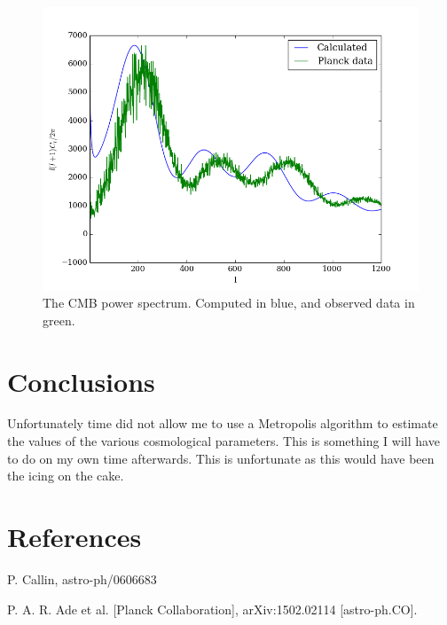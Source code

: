 \documentclass[a4paper]{report}
\begin{document}
\begin{figure}[ht]
 \includegraphics[width=\textwidth]{Cl.png}
 \caption{The CMB power spectrum. Computed in blue, and observed data in green.}
 \label{fig:Cl}
\end{figure}


\section{Conclusions}\label{sec:Conc}
Unfortunately time did not allow me to use a Metropolis algorithm to estimate the values of the various cosmological parameters. This is something I will have to do on my own time afterwards. This is unfortunate as this would have been the icing on the cake.


\section{References}
\begin{enumerate}[label= {[}\arabic*{]} ]
 \item P. Callin, astro-ph/0606683
 \item P. A. R. Ade et al. [Planck Collaboration], arXiv:1502.02114 [astro-ph.CO].
 
\end{enumerate}
\end{document}
